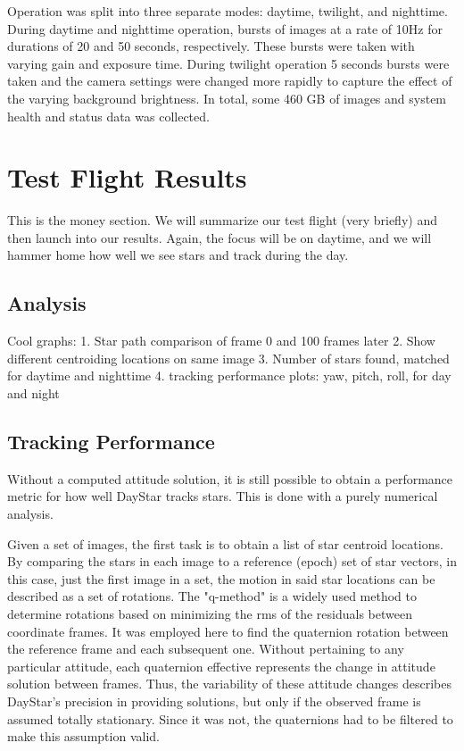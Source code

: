\documentclass[twocolumn,letterpaper]{IEEEAerospace2012}
\begin{document}
Operation was split into three separate modes: daytime, twilight, and nighttime. During daytime and nighttime operation, bursts of images at a rate of 10Hz for durations of 20 and 50 seconds, respectively. These bursts were taken with varying gain and exposure time. During twilight operation 5 seconds bursts were taken and the camera settings were changed more rapidly to capture the effect of the varying background brightness. In total, some 460 GB of images and system health and status data was collected.

\section{Test Flight Results}
This is the money section. We will summarize our test flight (very briefly) and then launch into our results. Again, the focus will be on daytime, and we will hammer home how well we see stars and track during the day.

\subsection{Analysis}
Cool graphs:
1. Star path comparison of frame 0 and 100 frames later
2. Show different centroiding locations on same image
3. Number of stars found, matched for daytime and nighttime
4. tracking performance plots: yaw, pitch, roll, for day and night

\subsection{Tracking Performance}
Without a computed attitude solution, it is still possible to obtain a performance metric for how well DayStar tracks stars. This is done with a purely numerical analysis.

Given a set of images, the first task is to obtain a list of star centroid locations. By comparing the stars in each image to a reference (epoch) set of star vectors, in this case, just the first image in a set, the motion in said star locations can be described as a set of rotations. The "q-method" is a widely used method to determine rotations based on minimizing the rms of the residuals between coordinate frames. It was employed here to find the quaternion rotation between the reference frame and each subsequent one. Without pertaining to any particular attitude, each quaternion effective represents the change in attitude solution between frames. Thus, the variability of these attitude changes describes DayStar's precision in providing solutions, but only if the observed frame is assumed totally stationary. Since it was not, the quaternions had to be filtered to make this assumption valid.
\end{document}
